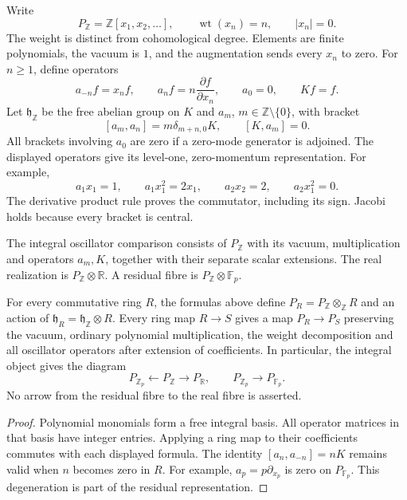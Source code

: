 Write
\[
 P_{\mathbb Z}=\mathbb Z[x_1,x_2,\ldots],\qquad
 \operatorname{wt}(x_n)=n,\qquad |x_n|=0.
\]
The weight is distinct from cohomological degree. Elements are finite
polynomials, the vacuum is $1$, and the augmentation sends every $x_n$
to zero. For $n\ge1$, define operators
\[
 a_{-n}f=x_nf,\qquad a_nf=n\frac{\partial f}{\partial x_n},
 \qquad a_0=0,\qquad Kf=f.
\]
Let $\mathfrak h_{\mathbb Z}$ be the free abelian group on $K$ and
$a_m$, $m\in\mathbb Z\setminus\{0\}$, with bracket
\[
 [a_m,a_n]=m\delta_{m+n,0}K,\qquad [K,a_m]=0.
\]
All brackets involving $a_0$ are zero if a zero-mode generator is adjoined.
The displayed operators give its level-one, zero-momentum representation.
For example,
\[
 a_1x_1=1,\qquad a_1x_1^2=2x_1,\qquad
 a_2x_2=2,\qquad a_2x_1^2=0.
\]
The derivative product rule proves the commutator, including its sign.
Jacobi holds because every bracket is central.

\begin{definition}
\label{v4-arith:pos-costello:def:Witt-classical-limit}
The integral oscillator comparison consists of $P_{\mathbb Z}$ with its
vacuum, multiplication and operators $a_m,K$, together with their
separate scalar extensions. The real realization is
$P_{\mathbb Z}\otimes\mathbb R$. A residual fibre is
$P_{\mathbb Z}\otimes\mathbb F_p$.
\end{definition}

\begin{proposition}
\label{v4-arith:c4:integral-fibres}
\label{v4-arith:pos-costello:prop:arch-classical-limit}
For every commutative ring $R$, the formulas above define
$P_R=P_{\mathbb Z}\otimes_{\mathbb Z}R$ and an action of
$\mathfrak h_R=\mathfrak h_{\mathbb Z}\otimes R$.
Every ring map $R\to S$ gives a map $P_R\to P_S$ preserving the vacuum,
ordinary polynomial multiplication, the weight decomposition and all
oscillator operators after extension of coefficients.
In particular, the integral object gives the diagram
\[
 P_{\mathbb Z_p}\longleftarrow P_{\mathbb Z}
 \longrightarrow P_{\mathbb R},\qquad
 P_{\mathbb Z_p}\longrightarrow P_{\mathbb F_p}.
\]
No arrow from the residual fibre to the real fibre is asserted.
\end{proposition}

\begin{proof}
Polynomial monomials form a free integral basis. All operator matrices
in that basis have integer entries. Applying a ring map to their
coefficients commutes with each displayed formula. The identity
$[a_n,a_{-n}]=nK$ remains valid when $n$ becomes zero in $R$.
For example, $a_p=p\partial_{x_p}$ is zero on $P_{\mathbb F_p}$.
This degeneration is part of the residual representation.
\end{proof}

